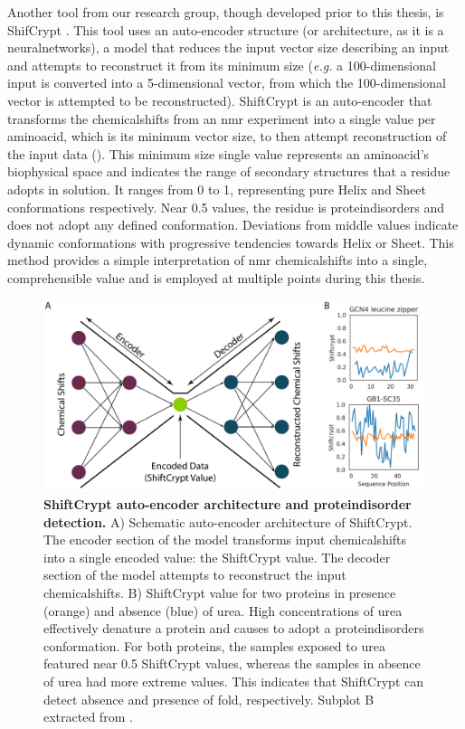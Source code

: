 Another tool from our research group, though developed prior to this thesis, is ShifCrypt \cite{orlando_shiftcrypt_2020}. This tool uses an auto-encoder structure (or architecture, as it is a \gls{neuralnetworks}), a model that reduces the input vector size describing an input and attempts to reconstruct it from its minimum size \cite{lopez_pinaya_chapter_2020} (\textit{e.g.} a 100-dimensional input is converted into a 5-dimensional vector, from which the 100-dimensional vector is attempted to be reconstructed). ShiftCrypt is an auto-encoder that transforms the \glspl{chemicalshift} from an \gls{nmr} experiment into a single value per \gls{aminoacid}, which is its minimum vector size, to then attempt reconstruction of the input data (). This minimum size single value represents an \gls{aminoacid}'s biophysical space and indicates the range of secondary structures that a residue adopts in solution. It ranges from 0 to 1, representing pure Helix and Sheet \glspl{conformation} respectively. Near 0.5 values, the residue is \glspl{proteindisorder} and does not adopt any defined \gls{conformation}. Deviations from middle values indicate dynamic \glspl{conformation} with progressive tendencies towards Helix or Sheet. This method provides a simple interpretation of \gls{nmr} \glspl{chemicalshift} into a single, comprehensible value and is employed at multiple points during this thesis. 

\begin{figure}[tbh]
    \centering
    \includegraphics[width=1\linewidth]{figures/shiftcrypt.pdf}
    \caption{\textbf{ShiftCrypt auto-encoder architecture and \gls{proteindisorder} detection.} A) Schematic auto-encoder architecture of ShiftCrypt. The encoder section of the model transforms input \glspl{chemicalshift} into a single encoded value: the ShiftCrypt value. The decoder section of the model attempts to reconstruct the input \glspl{chemicalshift}. B) ShiftCrypt value for two proteins in presence (orange) and absence (blue) of urea. High concentrations of urea effectively denature a protein and causes to adopt a \glspl{proteindisorder} \gls{conformation}. For both proteins, the samples exposed to urea featured near 0.5 ShiftCrypt values, whereas the samples in absence of urea had more extreme values. This indicates that ShiftCrypt can detect absence and presence of fold, respectively. Subplot B extracted from \cite{orlando_shiftcrypt_2020}.}
    \label{fig:chapter1:shiftcrypt}
\end{figure}


